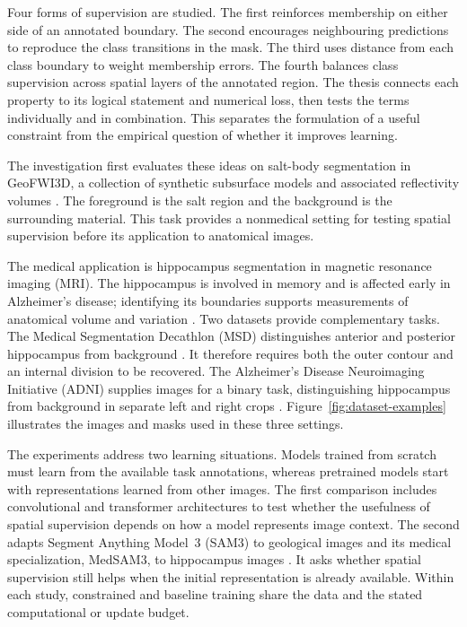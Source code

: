 \documentclass[12pt,a4paper]{article}
\begin{document}
Four forms of supervision are studied. The first reinforces membership
on either side of an annotated boundary. The second encourages
neighbouring predictions to reproduce the class transitions in the mask.
The third uses distance from each class boundary to weight membership
errors. The fourth balances class supervision across spatial layers of
the annotated region. The thesis connects each property to its logical
statement and numerical loss, then tests the terms individually and in
combination. This separates the formulation of a useful constraint from
the empirical question of whether it improves learning.

The investigation first evaluates these ideas on salt-body segmentation
in GeoFWI3D, a collection of synthetic subsurface models and associated
reflectivity volumes \cite{swaminadhan2026geofwi3d}. The foreground is the
salt region and the background is the surrounding material. This task
provides a nonmedical setting for testing spatial supervision before its
application to anatomical images.

The medical application is hippocampus segmentation in magnetic resonance
imaging (MRI). The hippocampus is involved in memory and is affected early
in Alzheimer's disease; identifying its boundaries supports measurements
of anatomical volume and variation \cite{niaAlzheimerBrain}. Two datasets
provide complementary tasks. The Medical Segmentation Decathlon (MSD)
distinguishes anterior and posterior hippocampus from background
\cite{simpson2019dataset}. It therefore requires both the outer contour
and an internal division to be recovered. The Alzheimer's Disease
Neuroimaging Initiative (ADNI) supplies images for a binary task,
distinguishing hippocampus from background in separate left and right
crops \cite{adniStudy}. Figure~\ref{fig:dataset-examples} illustrates the
images and masks used in these three settings.

The experiments address two learning situations. Models trained from
scratch must learn from the available task annotations, whereas pretrained
models start with representations learned from other images. The first
comparison includes convolutional and transformer architectures to test
whether the usefulness of spatial supervision depends on how a model
represents image context. The second adapts Segment Anything Model~3
(SAM3) to geological images and its medical specialization, MedSAM3, to
hippocampus images \cite{carion2025sam3,liu2025medsam3}. It asks whether
spatial supervision still helps when the initial representation is
already available. Within each study, constrained and baseline training
share the data and the stated computational or update budget.
\end{document}
